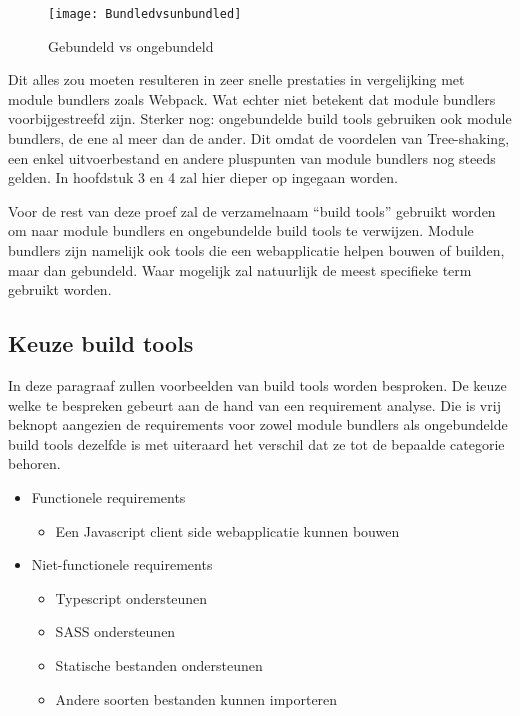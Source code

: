 \begin{figure}[h]
\texttt{[image: Bundledvsunbundled]}
   \caption{Gebundeld vs ongebundeld \autocite{snowpack-no-date}}
\end{figure}

Dit alles zou moeten resulteren in zeer snelle prestaties in vergelijking met module bundlers zoals Webpack. Wat echter niet betekent dat module bundlers voorbijgestreefd zijn. Sterker nog: ongebundelde build tools gebruiken ook module bundlers, de ene al meer dan de ander. Dit omdat de voordelen van Tree-shaking, een enkel uitvoerbestand en andere pluspunten van module bundlers nog steeds gelden. In hoofdstuk 3 en 4 zal hier dieper op ingegaan worden.

Voor de rest van deze proef zal de verzamelnaam “build tools” gebruikt worden om naar module bundlers en ongebundelde build tools te verwijzen. Module bundlers zijn namelijk ook tools die een webapplicatie helpen bouwen of builden, maar dan gebundeld. Waar mogelijk zal natuurlijk de meest specifieke term gebruikt worden.

\subsection{Keuze build tools}

In deze paragraaf zullen voorbeelden van build tools worden besproken. De keuze welke te bespreken gebeurt aan de hand van een requirement analyse. Die is vrij beknopt aangezien de requirements voor zowel module bundlers als ongebundelde build tools dezelfde is met uiteraard het verschil dat ze tot de bepaalde categorie behoren.

\begin{itemize}
   \item Functionele requirements
   \begin{itemize}
     \item Een \gls{Javascript} client side webapplicatie kunnen bouwen
   \end{itemize}
   \item Niet-functionele requirements
   \begin{itemize}
     \item Typescript ondersteunen
     \item \gls{SASS} ondersteunen
     \item Statische bestanden ondersteunen
     \item Andere soorten bestanden kunnen importeren
   \end{itemize}
\end{itemize}

